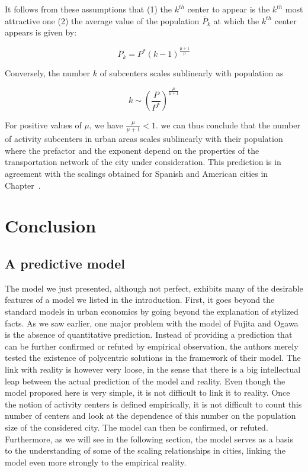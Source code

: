 It follows from these assumptions that (1) the $k^{th}$ center to appear is the
$k^{th}$ most attractive one (2) the average value of the population
$\overline{P}_k$ at which the $k^{th}$ center appears is given by:

\begin{equation} 
    \overline{P}_k = P^* \left( k-1 \right)^{\frac{\mu+1}{\mu}}
\end{equation}

Conversely, the number $k$ of subcenters scales sublinearly with population as

\begin{equation} 
    \boxed{k \sim \left( \frac{P}{P^*} \right)^{\frac{\mu}{\mu
    + 1}}}
    \label{eq:centers_prediction}
\end{equation} 

For positive values of $\mu$, we have $\frac{\mu}{\mu+1}<1$. we can thus
conclude that the number of activity subcenters in urban areas scales sublinearly
with their population where the prefactor and the exponent depend on the
properties of the transportation network of the city under consideration. This
prediction is in agreement with the scalings obtained for Spanish and American
cities in Chapter~\cite{scaling:introduction}.


\section{Conclusion}
\label{sec:conclusion}


\subsection{A predictive model}
\label{sub:a_predictive_mode}

The model we just presented, although not perfect, exhibits many of the
desirable features of a model we listed in the introduction. First, it goes
beyond the standard models in urban economics by going beyond the explanation of
stylized facts. As we saw earlier, one major problem with the model of Fujita
and Ogawa is the absence of quantitative prediction. Instead of providing a
prediction that can be further confirmed or refuted by empirical observation,
the authors merely tested the existence of polycentric solutions in the
framework of their model. The link with reality is however very loose, in the
sense that there is a big intellectual leap between the actual prediction of the
model and reality. Even though the model proposed here is very simple, it is not
difficult to link it to reality. Once the notion of activity centers is defined
empirically, it is not difficult to count this number of centers and look at the
dependence of this number on the population size of the considered city. The
model can then be confirmed, or refuted. Furthermore, as we will see in the
following section, the model serves as a basis to the understanding of some of
the scaling relationships in cities, linking the model even more strongly to the
empirical reality.

